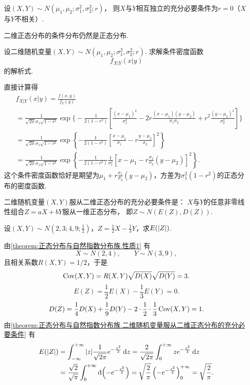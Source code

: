 \begin{corollary}\label{theorem:正态分布与自然指数分布族.性质3}
设\((X,Y) \sim N(\mu_1,\mu_2;\sigma_1^2,\sigma_2^2;r)\)，
则\(X\)与\(Y\)相互独立的充分必要条件为\(r=0\)（\(X\)与\(Y\)不相关）.
\end{corollary}

二维正态分布的条件分布仍然是正态分布.
\begin{example}\label{theorem:正态分布与自然指数分布族.性质4}
设二维随机变量\((X,Y) \sim N(\mu_1,\mu_2;\sigma_1^2,\sigma_2^2;r)\).
求解条件密度函数\[
f_{X \vert Y}(x \vert y)
\]的解析式.
\begin{solution}
\def\A{\frac{1}{\sqrt{2\pi}\sigma_1\sqrt{1-r^2}}}%
\def\B{\frac{1}{2(1-r^2)}}%
直接计算得\begin{align*}
&f_{X \vert Y}(x \vert y) = \frac{f(x,y)}{f_Y(y)} \\
&= \A
	\exp\Biggl\{
		- \B
		\left[
			\frac{(x-\mu_1)^2}{\sigma_1^2}
			- 2r\frac{(x-\mu_1)(y-\mu_2)}{\sigma_1\sigma_2}
			+ r^2\frac{(y-\mu_2)^2}{\sigma_2^2}
		\right]
	\Biggr\} \\
&= \A
	\exp\left\{
		- \B
		\left[
			\frac{x-\mu_1}{\sigma_1}
			- r\frac{y-\mu_2}{\sigma_2}
		\right]^2
	\right\} \\
&= \A
	\exp\left\{
		- \B
		\frac{1}{\sigma_1^2}
		\left[
			x - \mu_1
			- r\frac{\sigma_1}{\sigma_2}(y-\mu_2)
		\right]^2
	\right\}.
\end{align*}
这个条件密度函数恰好是期望为\(\mu_1+r\frac{\sigma_1}{\sigma_2}(y-\mu_2)\)，方差为\(\sigma_1^2(1-r^2)\)的正态分布的密度函数.
\end{solution}
\end{example}

\begin{theorem}\label{theorem:正态分布与自然指数分布族.二维随机变量服从二维正态分布的充分必要条件}
二维随机变量\((X,Y)\)服从二维正态分布的充分必要条件是：
\(X\)与\(Y\)的任意非零线性组合\(Z=aX+bY\)服从一维正态分布，
即\(Z \sim N(E(Z),D(Z))\).
\end{theorem}

\begin{example}
设\((X,Y) \sim N\left(2,3;4,9;\frac{1}{2}\right)\)，\(Z = \frac{1}{2} X - \frac{1}{3} Y\)，求\(E(\abs{Z})\).
\begin{solution}
由\cref{theorem:正态分布与自然指数分布族.性质1} 有\[
X \sim N(2,4), \qquad
Y \sim N(3,9),
\]且相关系数\(R(X,Y) = 1/2\)，于是\[
\operatorname{Cov}(X,Y) = R(X,Y) \sqrt{D(X)} \sqrt{D(Y)} = 3.
\]\[
E(Z) = \frac{1}{2} E(X) - \frac{1}{3} E(Y) = 0.
\]\[
D(Z) = \frac{1}{4} D(X) + \frac{1}{9} D(Y)
	- 2 \cdot \frac{1}{2} \cdot \frac{1}{3} \operatorname{Cov}(X,Y)
= 1.
\]
由\cref{theorem:正态分布与自然指数分布族.二维随机变量服从二维正态分布的充分必要条件} 有\begin{align*}
E(\abs{Z})
&= \int_{-\infty}^{+\infty} \abs{z} \frac{1}{\sqrt{2\pi}} e^{-\frac{z^2}{2}} \dd{z}
= \frac{2}{\sqrt{2\pi}} \int_0^{+\infty} z e^{-\frac{z^2}{2}} \dd{z} \\
&= \frac{\sqrt{2}}{\sqrt{\pi}} \int_0^{+\infty} \dd(-e^{-\frac{z^2}{2}})
= \sqrt{\frac{2}{\pi}} \left(-e^{-\frac{z^2}{2}}\right)_0^{+\infty}
= \sqrt{\frac{2}{\pi}}.
\end{align*}
\end{solution}
\end{example}

